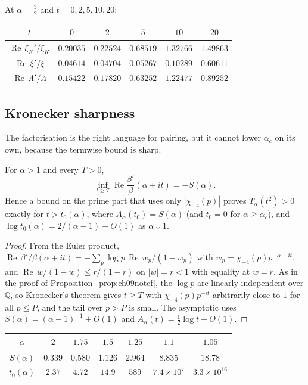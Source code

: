 At $\alpha=\tfrac32$ and $t=0,2,5,10,20$:

\begin{center}
\begin{tabular}{cccccc}
\toprule
$t$ & $0$ & $2$ & $5$ & $10$ & $20$\\
\midrule
$\operatorname{Re}\,\xi_K'/\xi_K$ & $0.20035$ & $0.22524$ & $0.68519$ & $1.32766$ & $1.49863$\\
$\operatorname{Re}\,\xi'/\xi$ & $0.04614$ & $0.04704$ & $0.05267$ & $0.10289$ & $0.60611$\\
$\operatorname{Re}\,\Lambda'/\Lambda$ & $0.15422$ & $0.17820$ & $0.63252$ & $1.22477$ & $0.89252$\\
\bottomrule
\end{tabular}
\end{center}

\subsection{Kronecker sharpness}

The factorisation is the right language for pairing, but it cannot lower $\alpha_c$ on its own, because the termwise bound is sharp.

\begin{proposition}\label{beta:prop:kron}
For $\alpha>1$ and every $T>0$,
\[
\inf_{t\ge T}\operatorname{Re}\frac{\beta'}{\beta}(\alpha+it)=-S(\alpha).
\]
Hence a bound on the prime part that uses only $|\chi_{-4}(p)|$ proves $T_\alpha(t^2)>0$ exactly for $t>t_0(\alpha)$, where $A_\alpha(t_0)=S(\alpha)$ (and $t_0=0$ for $\alpha\ge\alpha_c$), and $\log t_0(\alpha)=2/(\alpha-1)+O(1)$ as $\alpha\downarrow1$.
\end{proposition}

\begin{proof}
From the Euler product, $\operatorname{Re}\,\beta'/\beta(\alpha+it)=-\sum_p\log p\,\operatorname{Re}\,w_p/(1-w_p)$ with $w_p=\chi_{-4}(p)p^{-\alpha-it}$, and $\operatorname{Re}\,w/(1-w)\le r/(1-r)$ on $|w|=r<1$ with equality at $w=r$. As in the proof of Proposition~\ref{prop:ch09notcf}, the $\log p$ are linearly independent over $\mathbb Q$, so Kronecker's theorem gives $t\ge T$ with $\chi_{-4}(p)p^{-it}$ arbitrarily close to $1$ for all $p\le P$, and the tail over $p>P$ is small. The asymptotic uses $S(\alpha)=(\alpha-1)^{-1}+O(1)$ and $A_\alpha(t)=\tfrac12\log t+O(1)$.
\end{proof}

\begin{center}
\begin{tabular}{ccccccc}
\toprule
$\alpha$ & $2$ & $1.75$ & $1.5$ & $1.25$ & $1.1$ & $1.05$\\
\midrule
$S(\alpha)$ & $0.339$ & $0.580$ & $1.126$ & $2.964$ & $8.835$ & $18.78$\\
$t_0(\alpha)$ & $2.37$ & $4.72$ & $14.9$ & $589$ & $7.4\times10^7$ & $3.3\times10^{16}$\\
\bottomrule
\end{tabular}
\end{center}

